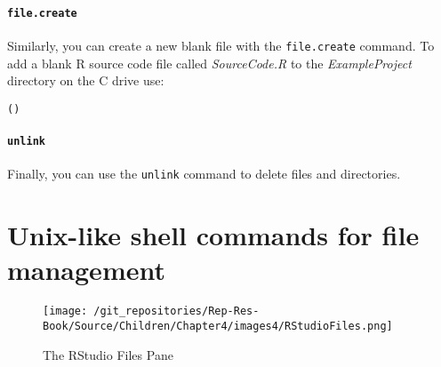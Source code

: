 \paragraph{{\tt{file.create}}}

Similarly, you can create a new blank file with the \texttt{file.create} command. To add a blank R source code file called {\emph{SourceCode.R}} to the {\emph{ExampleProject}} directory on the C drive use:

\begin{knitrout}
\color{fgcolor}\begin{kframe}
\begin{alltt}
()
\end{alltt}
\end{kframe}
\end{knitrout}


\paragraph{{\tt{unlink}}}

Finally, you can use the {\tt{unlink}} command to delete files and directories. 

\section{Unix-like shell commands for file management} 


\begin{wrapfigure}{r}{0.5\textwidth}
    \caption{The RStudio Files Pane} %
    \label{FilesPane}
        \begin{center}    
        \texttt{[image: /git\_repositories/Rep-Res-Book/Source/Children/Chapter4/images4/RStudioFiles.png]}
        \end{center}
\end{wrapfigure}

